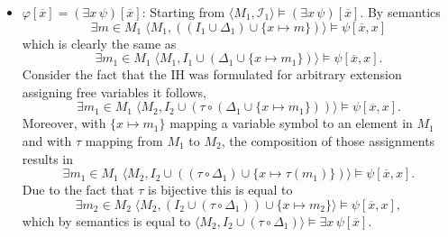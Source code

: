 \documentclass[11pt,a4paper]{article}
\begin{document}
\begin{itemize}[leftmargin=*]
\item  $\varphi[\overline{x}] = (\exists x \, \psi)[\overline{x}]$: Starting from $\langle M_1, \mathcal{I}_1 \rangle \models (\exists x \, \psi)[\overline{x}]$. By semantics  
\begin{equation*}
\exists m \in M_1 \; \langle M_1 , ((I_1 \cup \Delta_1) \cup \{x \mapsto m\}) \rangle \models \psi[\overline{x},x]
\end{equation*}
which is clearly the same as
\begin{equation*}
\exists m_1 \in M_1 \; \langle M_1 , I_1 \cup (\Delta_1 \cup \{x \mapsto m_1\}) \rangle \models \psi[\overline{x},x].
\end{equation*}
Consider the fact that the IH was formulated for arbitrary extension assigning free variables it follows,
 \begin{equation*}
\exists m_1 \in M_1 \;  \langle M_2 , I_2 \cup (\tau \circ (\Delta_1 \cup \{x \mapsto m_1\})) \rangle \models \psi[\overline{x},x].
\end{equation*} 
Moreover, with $\{x \mapsto m_1\}$ mapping a variable symbol to an element in $M_1$ and with $\tau$ mapping from $M_1$ to $M_2$, the composition of those assignments results in 
\begin{equation*}
\exists m_1 \in M_1 \;  \langle M_2 , I_2 \cup ((\tau \circ \Delta_1) \cup \{x \mapsto \tau (m_1)\}) \rangle \models \psi[\overline{x},x].
\end{equation*}
Due to the fact that $\tau$ is bijective this is equal to 
\begin{equation*}
\exists m_2 \in M_2 \;  \langle M_2 , (I_2 \cup (\tau \circ \Delta_1)) \cup \{x \mapsto m_2 \} \rangle \models \psi[\overline{x},x],
\end{equation*}
which by semantics is equal to $\langle M_2 , I_2 \cup (\tau \circ \Delta_1)\rangle \models \exists x \, \psi[\overline{x}]$. \\



\end{itemize}
\end{document}
